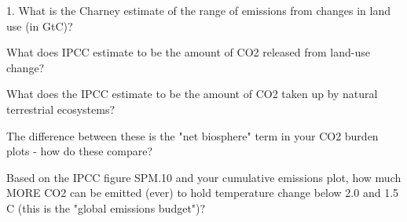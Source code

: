 \documentclass[11pt]{book}
\begin{document}
\bee
\item 1. What is the Charney estimate of the range of emissions from changes in land use (in GtC)?

\item What does IPCC estimate to be the amount of CO2 released from land-use change?

\item What does the IPCC estimate to be the amount of CO2 taken up by natural terrestrial ecosystems?

\item The difference between these is the "net biosphere" term in your CO2 burden plots - how do these compare?

\item Based on the IPCC figure SPM.10 and your cumulative emissions plot, how much MORE CO2 can be emitted (ever) to hold temperature change below 2.0 and 1.5 C (this is the "global emissions budget")?

\eee
\end{document}
